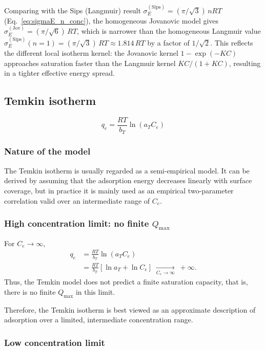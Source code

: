 	Comparing with the Sips (Langmuir) result
	$\sigma_E^{\mathrm{(Sips)}} = (\pi/\sqrt{3})\,nRT$
	(Eq.~\eqref{eq:sigmaE_n_conc}), the homogeneous Jovanovic model
	gives $\sigma_E^{\mathrm{(Jov)}} = (\pi/\sqrt{6})\,RT$, which is
	narrower than the homogeneous Langmuir value
	$\sigma_E^{\mathrm{(Sips)}}(n=1) = (\pi/\sqrt{3})\,RT
	\approx 1.814\,RT$ by a factor of $1/\sqrt{2}$. This reflects the
	different local isotherm kernel: the Jovanovic kernel
	$1 - \exp(-KC)$ approaches saturation faster than the Langmuir
	kernel $KC/(1+KC)$, resulting in a tighter effective energy spread.

	\subsection{Temkin isotherm}
	\[
	q_e = \frac{RT}{b_T} \ln(a_T C_e)
	\]
	
	\subsubsection{Nature of the model}
	
	The Temkin isotherm is usually regarded as a semi-empirical model. It can be
	derived by assuming that the adsorption energy decreases linearly with surface
	coverage, but in practice it is mainly used as an empirical two-parameter
	correlation valid over an intermediate range of $C_e$.
	
	\subsubsection{High concentration limit: no finite $Q_{\max}$}
	
	For $C_e \to \infty$,
	\begin{align}
		q_e 
		&= \frac{RT}{b_T} \ln(a_T C_e) \nonumber \\
		&= \frac{RT}{b_T} \left[\ln a_T + \ln C_e\right]
		\;\xrightarrow[C_e \to \infty]{}\; +\infty.
	\end{align}
	Thus, the Temkin model does not predict a finite saturation capacity, that is, there is no finite $Q_{\max}$ in this limit.
	
	Therefore, the Temkin isotherm is best viewed as an approximate description of adsorption over a limited, intermediate concentration range.
	
	\subsubsection{Low concentration limit}
	
